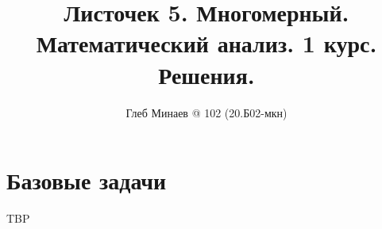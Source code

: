 \documentclass[12pt,a4paper]{article}
\title{Листочек 5. Многомерный.\\Математический анализ. 1 курс.\\Решения.}
\author{Глеб Минаев @ 102 (20.Б02-мкн)}
\DeclareMathOperator{\dist}{dist}
\begin{document}
    \maketitle

    \begin{multicols}{2}
        \tableofcontents
    \end{multicols}

    \section*{Базовые задачи}

    \begin{enumproblem}TBP





\end{enumproblem}
\end{document}
